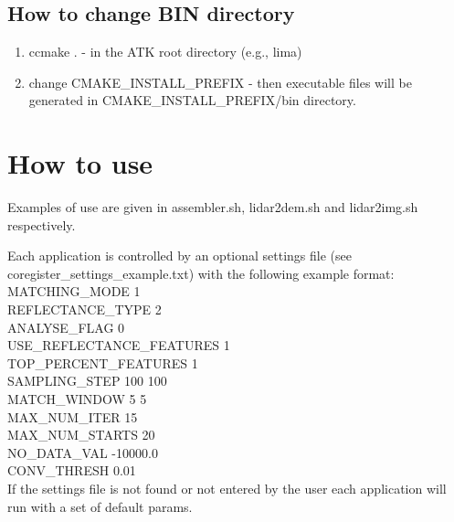 \documentclass[12pt]{article}
\begin{document}
\subsection{How to change BIN directory}\label{sec:How to change BIN directory}

\begin{enumerate}
	\item{ccmake .} - in the ATK root directory (e.g., lima)
	\item{change CMAKE\_INSTALL\_PREFIX} - then executable files will be generated in CMAKE\_INSTALL\_PREFIX/bin directory.
\end{enumerate}

\section{How to use}
Examples of use are given in assembler.sh, lidar2dem.sh and lidar2img.sh respectively.

Each application is controlled by an optional settings file (see coregister\_settings\_example.txt) with the following example format:\\
MATCHING\_MODE 1\\
REFLECTANCE\_TYPE 2\\
ANALYSE\_FLAG 0\\
USE\_REFLECTANCE\_FEATURES 1\\
TOP\_PERCENT\_FEATURES 1\\
SAMPLING\_STEP 100 100\\
MATCH\_WINDOW 5 5\\
MAX\_NUM\_ITER 15\\
MAX\_NUM\_STARTS 20\\
NO\_DATA\_VAL -10000.0\\
CONV\_THRESH 0.01\\

If the settings file is not found or not entered by the user each application will run with a set of default params.
\end{document}
